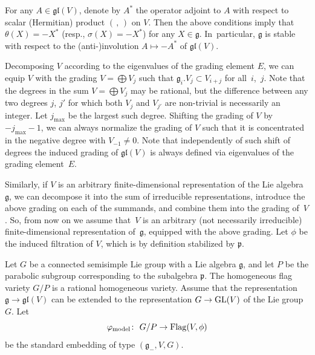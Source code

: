\documentclass[pdftex]{sigma}%
\newcommand{\g}{\mathfrak g}
\newcommand{\gl}{\mathfrak{gl}}
\newcommand{\pf}{\mathfrak p}
\newcommand{\V}{V}
\newcommand{\Flag}{\operatorname{Flag}}
\numberwithin{equation}{section}
\begin{document}
For any $A\in\gl(\V)$, denote by $A^*$ the operator adjoint to $A$ with respect
to scalar (Hermitian) product $(\,,\,)$ on $\V$. Then the above conditions imply
that $\theta(X)=-X^*$ (resp., $\sigma(X)=-X^*$) for any $X\in\g$. In~particular, $\g$ is stable with respect to the (anti-)involution $A\mapsto -A^*$ of $\gl(\V)$.


Decomposing $\V$ according to the eigenvalues of the grading element $E$, we
can equip $\V$ with the grading $\V=\bigoplus \V_{j}$ such that $\g_i.\V_j\subset \V_{i+j}$ for all~$i$,~$j$. Note that the degrees in the sum $\V=\bigoplus \V_{j}$ may be rational, but the difference between any two degrees $j$, $j'$ for which both $\V_{j}$ and $\V_{j'}$ are non-trivial is necessarily an integer. Let $j_{\max }$ be the largest such degree. Shifting the grading of $\V$ by $-j_{\max }-1$, we can always normalize the grading of $\V$ such that it is concentrated in the negative degree with $\V_{-1}\ne 0$. Note that independently of such shift of degrees the induced grading of $\gl(\V)$ is always defined via eigenvalues of the grading element~$E$.

Similarly, if $\V$ is an arbitrary finite-dimensional representation of the Lie algebra $\g$, we can decompose it into the sum of irreducible representations, introduce the above grading on each of the summands, and combine them into the grading of~$\V$. So, from now on we assume that~$\V$ is an arbitrary (not necessarily irreducible) finite-dimensional representation of~$\g$, equipped with the above grading. Let $\phi$ be the induced filtration of $\V$, which is by definition stabilized by $\pf$.

Let $G$ be a connected semisimple Lie group with a Lie algebra $\g$, and let $P$ be the parabolic subgroup corresponding to the subalgebra $\pf$. The homogeneous flag variety $G/P$ is a rational homogeneous variety.
Assume that the representation $\g\to\gl(\V)$ can be extended to the representation $G\to {\rm GL}(\V)$ of the Lie group $G$. Let
\[
\varphi_{{\rm model}}\colon\ G/P \to \Flag(\V,\phi)
\]
be the standard embedding of type $(\g_{-},\V,G)$.
\end{document}

